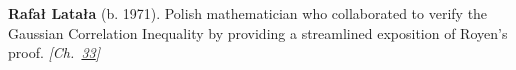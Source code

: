 \textbf{Rafał Latała} (b. 1971). Polish mathematician who collaborated to verify the Gaussian Correlation Inequality by providing a streamlined exposition of Royen's proof. \emph{[Ch.~\hyperref[ch:incubationinequality]{33}]}

